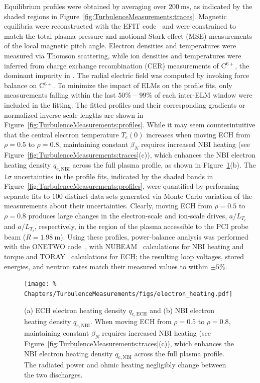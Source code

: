 Equilibrium profiles were obtained
by averaging over $\SI{200}{\milli\second}$,
as indicated by the shaded regions
in Figure~\ref{fig:TurbulenceMeasurements:traces}.
Magnetic equilibria were
reconstructed with the EFIT code~\cite{lao_fst05} and
were constrained to match the total plasma pressure and
motional Stark effect (MSE) measurements
of the local magnetic pitch angle.
Electron densities and temperatures
were measured via Thomson scattering, while
ion densities and temperatures
were inferred from charge exchange recombination (CER) measurements
of C$^{6+}$, the dominant impurity in \diiid.
The radial electric field was computed
by invoking force balance on C$^{6+}$.
To minimize the impact of ELMs on the profile fits,
only measurements falling
within the last {$50\%$ -- $99\%$} of each inter-ELM window
were included in the fitting.
The fitted profiles and
their corresponding gradients or
normalized inverse scale lengths
are shown in
Figure~\ref{fig:TurbulenceMeasurements:profiles}.
While it may seem counterintuitive
that the central electron temperature $T_e(0)$
increases when moving ECH from $\rho = 0.5$ to $\rho = 0.8$,
maintaining constant $\beta_N$
requires increased NBI heating
(see Figure~\ref{fig:TurbulenceMeasurements:traces}(c)),
which enhances the NBI electron heating density $q_{e,\text{NBI}}$
across the full plasma profile,
as shown in Figure~\ref{fig:TurbulenceMeasurements:electron_heating}(b).
The $1\sigma$ uncertainties in the profile fits,
indicated by the shaded bands in
Figure~\ref{fig:TurbulenceMeasurements:profiles},
were quantified by
performing separate fits to $100$ distinct data sets
generated via Monte Carlo variation
of the measurements about their uncertainties.
Clearly, moving ECH from $\rho = 0.5$ to $\rho = 0.8$
produces large changes
in the electron-scale and ion-scale drives,
$a / L_{T_e}$ and $a / L_{T_i}$, respectively,
in the region of the plasma accessible to the PCI probe beam
($R = \SI{1.98}{\meter}$).
Using these profiles,
power-balance analysis was performed
with the ONETWO code~\cite{pfeiffer_onetwo},
with NUBEAM~\cite{pankin_cpc04} calculations
for NBI heating and torque and
TORAY~\cite{matsuda_ieee89} calculations for ECH;
the resulting loop voltages, stored energies, and neutron rates
match their measured values to within $\pm 5\%$.

\begin{figure}
  \centering
  \texttt{[image: \%
    Chapters/TurbulenceMeasurements/figs/electron\_heating.pdf]}
  \caption[ECH \& NBI electron-heating profiles]{%
    (a) ECH electron heating density $q_{e,\text{ECH}}$ and
    (b) NBI electron heating density $q_{e,\text{NBI}}$.
    When moving ECH from $\rho = 0.5$ to $\rho = 0.8$,
    maintaining constant $\beta_N$
    requires increased NBI heating
    (see Figure~\ref{fig:TurbulenceMeasurements:traces}(c)),
    which enhances the NBI electron heating density $q_{e,\text{NBI}}$
    across the full plasma profile.
    The radiated power and ohmic heating
    negligibly change between the two discharges.
  }
\label{fig:TurbulenceMeasurements:electron_heating}
\end{figure}


